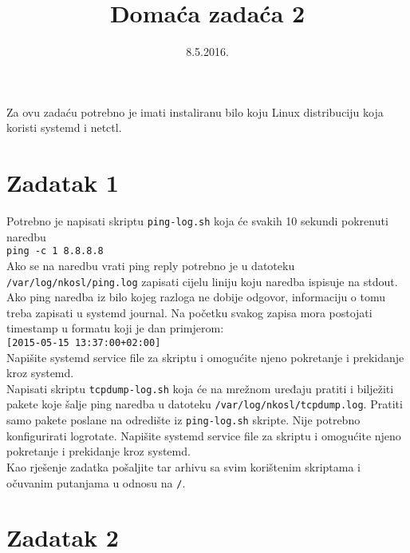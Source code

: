 \documentclass[12pt,a4paper]{article}
\begin{document}
	\title{Domaća zadaća 2}
	\date{\vspace{-5ex} 8.5.2016.}
	\maketitle

\noindent Za ovu zadaću potrebno je imati instaliranu bilo koju Linux distribuciju koja koristi systemd i netctl.

\section*{Zadatak 1}

Potrebno je napisati skriptu \texttt{ping-log.sh} koja će svakih 10 sekundi pokrenuti naredbu \\
\indent \texttt{ping -c 1 8.8.8.8}\\
Ako se na naredbu vrati ping reply potrebno je u datoteku \texttt{/var/log/nkosl/ping.log} zapisati cijelu liniju koju naredba ispisuje na stdout. Ako ping naredba iz bilo kojeg razloga ne dobije odgovor, informaciju o tomu treba zapisati u systemd journal. Na početku svakog zapisa mora postojati timestamp u formatu koji je dan primjerom: \\
\indent \texttt{[2015-05-15 13:37:00+02:00]}\\
Napišite systemd service file za skriptu i omogućite njeno pokretanje i prekidanje kroz systemd.\\

Napisati skriptu \texttt{tcpdump-log.sh} koja će na mrežnom uređaju pratiti i bilježiti pakete koje šalje ping naredba u datoteku \texttt{/var/log/nkosl/tcpdump.log}. Pratiti samo pakete poslane na odredište iz \texttt{ping-log.sh} skripte. Nije potrebno konfigurirati logrotate. Napišite systemd service file za skriptu i omogućite njeno pokretanje i prekidanje kroz systemd.\\

Kao rješenje zadatka pošaljite tar arhivu sa svim korištenim skriptama i očuvanim putanjama u odnosu na \texttt{/}.

\section*{Zadatak 2}
\end{document}
